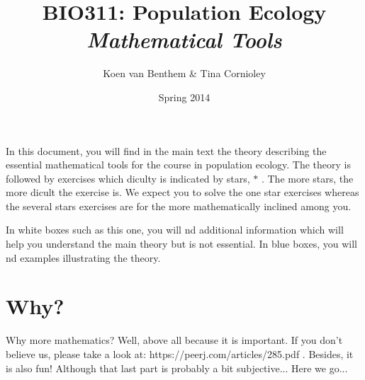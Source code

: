 \documentclass[a4paper]{report}
\title{BIO311: Population Ecology\\\textit{Mathematical Tools}}
\author{Koen van Benthem \& Tina Cornioley}
\date{Spring 2014}
\begin{document}
\maketitle
\tableofcontents
\begin{mdframed}
In this document, you will find in the main text the theory describing the essential mathematical tools for the course in population ecology. The theory is followed by exercises which diculty is indicated by stars, $\ast$ . The more stars, the more dicult the exercise is. We expect you to solve the one star exercises whereas the several stars exercises are for the more mathematically inclined among you.

In white boxes such as this one, you will nd additional information which will help you understand the main theory but is not essential. In blue boxes, you will nd examples illustrating the theory.
\end{mdframed}
\newpage
\section{Why?}
Why more mathematics? Well, above all because it is important. If you don't believe us, please take a look at: https://peerj.com/articles/285.pdf . Besides, it is also fun! Although that last part is probably a bit subjective... Here we go...
\end{document}
